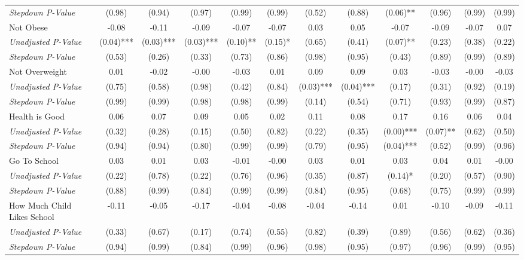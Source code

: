\begin{tabular}{l c c c c c c c c c c c}
\quad \textit{Stepdown P-Value} & (0.98) & (0.94) & (0.97) & (0.99) & (0.99) & (0.52) & (0.88) & (0.06)** & (0.96) & (0.99) & (0.99) \\
Not Obese & -0.08 & -0.11 & -0.09 & -0.07 & -0.07 & 0.03 & 0.05 & -0.07 & -0.09 & -0.07 & 0.07 \\
\quad \textit{Unadjusted P-Value} & (0.04)*** & (0.03)*** & (0.03)*** & (0.10)** & (0.15)* & (0.65) & (0.41) & (0.07)** & (0.23) & (0.38) & (0.22) \\
\quad \textit{Stepdown P-Value} & (0.53) & (0.26) & (0.33) & (0.73) & (0.86) & (0.98) & (0.95) & (0.43) & (0.89) & (0.99) & (0.89) \\
Not Overweight & 0.01 & -0.02 & -0.00 & -0.03 & 0.01 & 0.09 & 0.09 & 0.03 & -0.03 & -0.00 & -0.03 \\
\quad \textit{Unadjusted P-Value} & (0.75) & (0.58) & (0.98) & (0.42) & (0.84) & (0.03)*** & (0.04)*** & (0.17) & (0.31) & (0.92) & (0.19) \\
\quad \textit{Stepdown P-Value} & (0.99) & (0.99) & (0.98) & (0.98) & (0.99) & (0.14) & (0.54) & (0.71) & (0.93) & (0.99) & (0.87) \\
Health is Good & 0.06 & 0.07 & 0.09 & 0.05 & 0.02 & 0.11 & 0.08 & 0.17 & 0.16 & 0.06 & 0.04 \\
\quad \textit{Unadjusted P-Value} & (0.32) & (0.28) & (0.15) & (0.50) & (0.82) & (0.22) & (0.35) & (0.00)*** & (0.07)** & (0.62) & (0.50) \\
\quad \textit{Stepdown P-Value} & (0.94) & (0.94) & (0.80) & (0.99) & (0.99) & (0.79) & (0.95) & (0.04)*** & (0.52) & (0.99) & (0.96) \\
Go To School & 0.03 & 0.01 & 0.03 & -0.01 & -0.00 & 0.03 & 0.01 & 0.03 & 0.04 & 0.01 & -0.00 \\
\quad \textit{Unadjusted P-Value} & (0.22) & (0.78) & (0.22) & (0.76) & (0.96) & (0.35) & (0.87) & (0.14)* & (0.20) & (0.57) & (0.90) \\
\quad \textit{Stepdown P-Value} & (0.88) & (0.99) & (0.84) & (0.99) & (0.99) & (0.84) & (0.95) & (0.68) & (0.75) & (0.99) & (0.99) \\
How Much Child Likes School & -0.11 & -0.05 & -0.17 & -0.04 & -0.08 & -0.04 & -0.14 & 0.01 & -0.10 & -0.09 & -0.11 \\
\quad \textit{Unadjusted P-Value} & (0.33) & (0.67) & (0.17) & (0.74) & (0.55) & (0.82) & (0.39) & (0.89) & (0.56) & (0.62) & (0.36) \\
\quad \textit{Stepdown P-Value} & (0.94) & (0.99) & (0.84) & (0.99) & (0.96) & (0.98) & (0.95) & (0.97) & (0.96) & (0.99) & (0.95) \\

\end{tabular}
